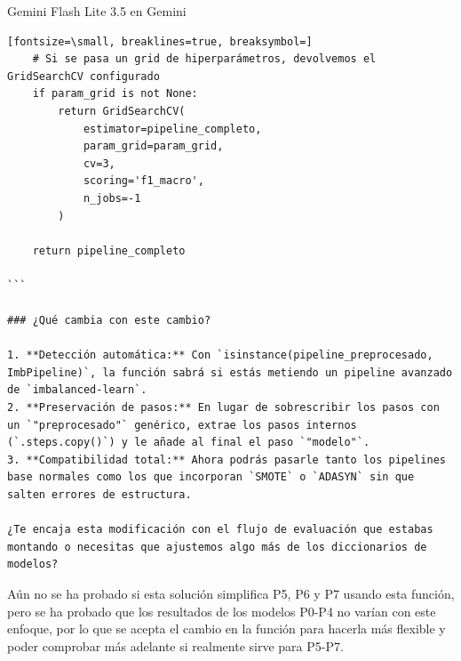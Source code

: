 \documentclass[12pt,a4paper,oneside]{book}
\begin{document}
\begin{iaresp}{Gemini Flash Lite 3.5 en Gemini}
\begin{Verbatim}[fontsize=\small, breaklines=true, breaksymbol=]
    # Si se pasa un grid de hiperparámetros, devolvemos el GridSearchCV configurado
    if param_grid is not None:
        return GridSearchCV(
            estimator=pipeline_completo, 
            param_grid=param_grid, 
            cv=3, 
            scoring='f1_macro', 
            n_jobs=-1
        )
        
    return pipeline_completo

```

### ¿Qué cambia con este cambio?

1. **Detección automática:** Con `isinstance(pipeline_preprocesado, ImbPipeline)`, la función sabrá si estás metiendo un pipeline avanzado de `imbalanced-learn`.
2. **Preservación de pasos:** En lugar de sobrescribir los pasos con un `"preprocesado"` genérico, extrae los pasos internos (`.steps.copy()`) y le añade al final el paso `"modelo"`.
3. **Compatibilidad total:** Ahora podrás pasarle tanto los pipelines base normales como los que incorporan `SMOTE` o `ADASYN` sin que salten errores de estructura.

¿Te encaja esta modificación con el flujo de evaluación que estabas montando o necesitas que ajustemos algo más de los diccionarios de modelos?
\end{Verbatim}
\end{iaresp}
\begin{iaanalisis}
Aún no se ha probado si esta solución simplifica P5, P6 y P7 usando esta función, pero se ha probado que los resultados de los modelos P0-P4 no varían con este enfoque, por lo que se acepta el cambio en la función para hacerla más flexible y poder comprobar más adelante si realmente sirve para P5-P7.
\end{iaanalisis}
\end{document}
